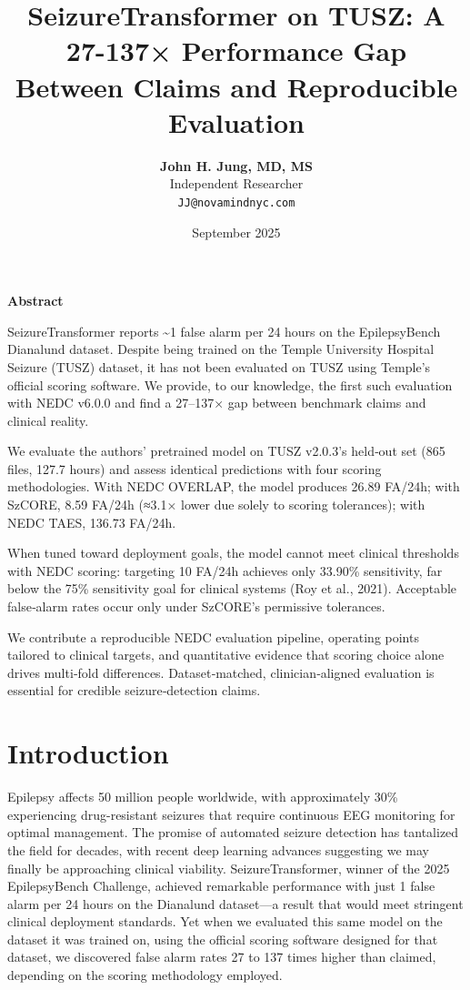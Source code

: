 \documentclass[
  10pt,
]{article}
\title{SeizureTransformer on TUSZ: A 27-137× Performance Gap Between
Claims and Reproducible Evaluation}
\author{\textbf{John H. Jung, MD, MS}\\Independent Researcher\\\texttt{JJ@novamindnyc.com}}
\date{September 2025}
\begin{document}
\maketitle

\hypertarget{abstract}{%
\begin{center}\textbf{Abstract}\end{center}\label{abstract}}

SeizureTransformer reports \textasciitilde1 false alarm per 24 hours on
the EpilepsyBench Dianalund dataset. Despite being trained on the Temple
University Hospital Seizure (TUSZ) dataset, it has not been evaluated on
TUSZ using Temple's official scoring software. We provide, to our
knowledge, the first such evaluation with NEDC v6.0.0 and find a
27--137× gap between benchmark claims and clinical reality.

We evaluate the authors' pretrained model on TUSZ v2.0.3's held‑out set
(865 files, 127.7 hours) and assess identical predictions with four
scoring methodologies. With NEDC OVERLAP, the model produces 26.89
FA/24h; with SzCORE, 8.59 FA/24h (≈3.1× lower due solely to scoring
tolerances); with NEDC TAES, 136.73 FA/24h.

When tuned toward deployment goals, the model cannot meet clinical
thresholds with NEDC scoring: targeting 10 FA/24h achieves only 33.90\%
sensitivity, far below the 75\% sensitivity goal for clinical systems
(Roy et al., 2021). Acceptable false‑alarm rates occur only under
SzCORE's permissive tolerances.

We contribute a reproducible NEDC evaluation pipeline, operating points
tailored to clinical targets, and quantitative evidence that scoring
choice alone drives multi‑fold differences. Dataset‑matched,
clinician‑aligned evaluation is essential for credible seizure‑detection
claims.



\hypertarget{introduction}{%
\section{Introduction}\label{introduction}}

Epilepsy affects 50 million people worldwide, with approximately 30\%
experiencing drug-resistant seizures that require continuous EEG
monitoring for optimal management. The promise of automated seizure
detection has tantalized the field for decades, with recent deep
learning advances suggesting we may finally be approaching clinical
viability. SeizureTransformer, winner of the 2025 EpilepsyBench
Challenge, achieved remarkable performance with just 1 false alarm per
24 hours on the Dianalund dataset---a result that would meet stringent
clinical deployment standards. Yet when we evaluated this same model on
the dataset it was trained on, using the official scoring software
designed for that dataset, we discovered false alarm rates 27 to 137
times higher than claimed, depending on the scoring methodology
employed.
\end{document}
